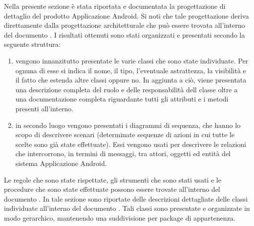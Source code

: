     Nella presente sezione è stata riportata e documentata la progettazione di dettaglio del prodotto Applicazione Android. Si noti che tale progettazione deriva direttamente dalla progettazione architetturale che può essere trovata all'interno del documento . I risultati ottenuti sono stati organizzati e presentati secondo la seguente struttura:
    \begin{enumerate}
        \item vengono innanzitutto presentate le varie classi che sono state individuate. Per ognuna di esse si indica il nome, il tipo, l'eventuale astrattezza, la visibilità e il fatto che estenda altre classi oppure no. In aggiunta a ciò, viene presentata una descrizione completa del ruolo e delle responsabilità dell classe oltre a una documentazione completa riguardante tutti gli attributi e i metodi presenti all'interno.
        \item in secondo luogo vengono presentati i diagrammi di sequenza, che hanno lo scopo di descrivere scenari (determinate sequenze di azioni in cui tutte le scelte sono già state effettuate). Essi vengono usati per descrivere le relazioni che intercorrono, in termini di messaggi, tra attori, oggetti ed entità del sistema Applicazione Android.
    \end{enumerate}
    Le regole che sono state rispettate, gli strumenti che sono stati usati e le procedure che sono state effettuate possono essere trovate all'interno del documento .
        In tale sezione sono riportate delle descrizioni dettagliate delle classi individuate all'interno del documento . Tali classi sono presentate e organizzate in modo gerarchico, mantenendo una suddivisione per package di appartenenza.
        

        


